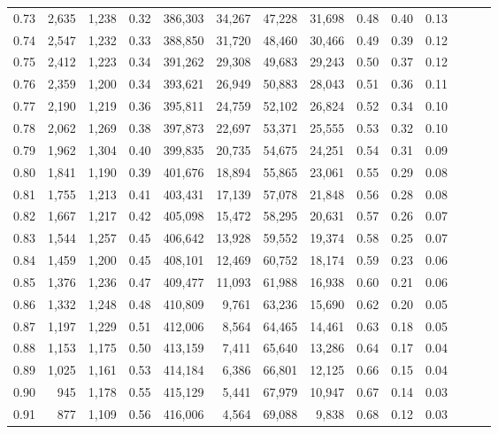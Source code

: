 \begin{tabular}{rrrrrrrrrrrrrr}
0.73 &  2,635 &  1,238 &  0.32 &  386,303 &   34,267 &  47,228 &  31,698 &  0.48 &  0.40 &      0.13 \\
0.74 &  2,547 &  1,232 &  0.33 &  388,850 &   31,720 &  48,460 &  30,466 &  0.49 &  0.39 &      0.12 \\
0.75 &  2,412 &  1,223 &  0.34 &  391,262 &   29,308 &  49,683 &  29,243 &  0.50 &  0.37 &      0.12 \\
0.76 &  2,359 &  1,200 &  0.34 &  393,621 &   26,949 &  50,883 &  28,043 &  0.51 &  0.36 &      0.11 \\
0.77 &  2,190 &  1,219 &  0.36 &  395,811 &   24,759 &  52,102 &  26,824 &  0.52 &  0.34 &      0.10 \\
0.78 &  2,062 &  1,269 &  0.38 &  397,873 &   22,697 &  53,371 &  25,555 &  0.53 &  0.32 &      0.10 \\
0.79 &  1,962 &  1,304 &  0.40 &  399,835 &   20,735 &  54,675 &  24,251 &  0.54 &  0.31 &      0.09 \\
0.80 &  1,841 &  1,190 &  0.39 &  401,676 &   18,894 &  55,865 &  23,061 &  0.55 &  0.29 &      0.08 \\
0.81 &  1,755 &  1,213 &  0.41 &  403,431 &   17,139 &  57,078 &  21,848 &  0.56 &  0.28 &      0.08 \\
0.82 &  1,667 &  1,217 &  0.42 &  405,098 &   15,472 &  58,295 &  20,631 &  0.57 &  0.26 &      0.07 \\
0.83 &  1,544 &  1,257 &  0.45 &  406,642 &   13,928 &  59,552 &  19,374 &  0.58 &  0.25 &      0.07 \\
0.84 &  1,459 &  1,200 &  0.45 &  408,101 &   12,469 &  60,752 &  18,174 &  0.59 &  0.23 &      0.06 \\
0.85 &  1,376 &  1,236 &  0.47 &  409,477 &   11,093 &  61,988 &  16,938 &  0.60 &  0.21 &      0.06 \\
0.86 &  1,332 &  1,248 &  0.48 &  410,809 &    9,761 &  63,236 &  15,690 &  0.62 &  0.20 &      0.05 \\
0.87 &  1,197 &  1,229 &  0.51 &  412,006 &    8,564 &  64,465 &  14,461 &  0.63 &  0.18 &      0.05 \\
0.88 &  1,153 &  1,175 &  0.50 &  413,159 &    7,411 &  65,640 &  13,286 &  0.64 &  0.17 &      0.04 \\
0.89 &  1,025 &  1,161 &  0.53 &  414,184 &    6,386 &  66,801 &  12,125 &  0.66 &  0.15 &      0.04 \\
0.90 &    945 &  1,178 &  0.55 &  415,129 &    5,441 &  67,979 &  10,947 &  0.67 &  0.14 &      0.03 \\
0.91 &    877 &  1,109 &  0.56 &  416,006 &    4,564 &  69,088 &   9,838 &  0.68 &  0.12 &      0.03 \\

\end{tabular}
